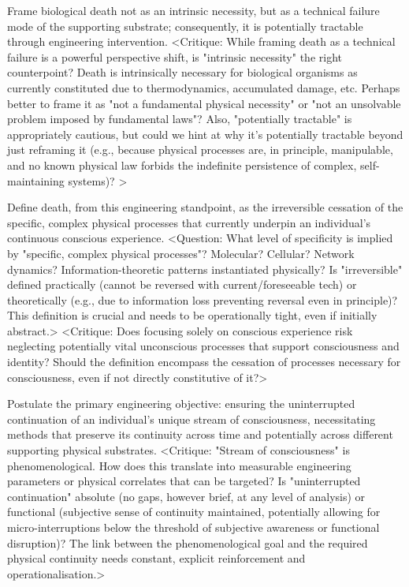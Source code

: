 \documentclass[10pt]{article}
\begin{document}
\begin{sloppypar}
  Frame biological death not as an intrinsic necessity, but as a technical failure mode of the supporting substrate; consequently, it is potentially tractable through engineering intervention. <Critique: While framing death as a technical failure is a powerful perspective shift, is "intrinsic necessity" the right counterpoint? Death is intrinsically necessary for biological organisms as currently constituted due to thermodynamics, accumulated damage, etc. Perhaps better to frame it as "not a fundamental physical necessity" or "not an unsolvable problem imposed by fundamental laws"? Also, "potentially tractable" is appropriately cautious, but could we hint at why it's potentially tractable beyond just reframing it (e.g., because physical processes are, in principle, manipulable, and no known physical law forbids the indefinite persistence of complex, self-maintaining systems)? >

  Define death, from this engineering standpoint, as the irreversible cessation of the specific, complex physical processes that currently underpin an individual's continuous conscious experience. <Question: What level of specificity is implied by "specific, complex physical processes"? Molecular? Cellular? Network dynamics? Information-theoretic patterns instantiated physically? Is "irreversible" defined practically (cannot be reversed with current/foreseeable tech) or theoretically (e.g., due to information loss preventing reversal even in principle)? This definition is crucial and needs to be operationally tight, even if initially abstract.> <Critique: Does focusing solely on conscious experience risk neglecting potentially vital unconscious processes that support consciousness and identity? Should the definition encompass the cessation of processes necessary for consciousness, even if not directly constitutive of it?>

  Postulate the primary engineering objective: ensuring the uninterrupted continuation of an individual's unique stream of consciousness, necessitating methods that preserve its continuity across time and potentially across different supporting physical substrates. <Critique: "Stream of consciousness" is phenomenological. How does this translate into measurable engineering parameters or physical correlates that can be targeted? Is "uninterrupted continuation" absolute (no gaps, however brief, at any level of analysis) or functional (subjective sense of continuity maintained, potentially allowing for micro-interruptions below the threshold of subjective awareness or functional disruption)? The link between the phenomenological goal and the required physical continuity needs constant, explicit reinforcement and operationalisation.>


\end{sloppypar}
\end{document}
